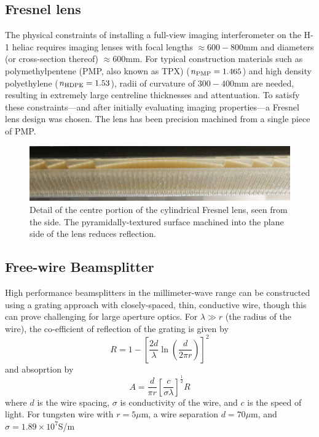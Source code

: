 \thispagestyle{empty}
\subsection{Fresnel lens}
The physical constraints of installing a full-view imaging interferometer on
the H-1 heliac requires imaging lenses with focal lengths $\approx 600
- 800$mm and diameters (or cross-section thereof) $\approx
600$mm.
For typical construction materials such as polymethylpentene
(PMP, also known as TPX) ($n_{\rm PMP} = 1.465$) and high density
polyethylene ($n_{\rm HDPE} = 1.53$), radii of curvature of $300 -
400$mm are needed, resulting in extremely large centreline thicknesses and
attentuation.
To satisfy these constraints---and after initially evaluating imaging properties\cite{MAHON2011}---a Fresnel lens design was chosen.
The lens has been precision machined from a single piece of PMP.
\begin{figure}[htbp]
\includegraphics[width=\columnwidth]{figures/fresnel_lens_detail}
\caption{Detail of the centre portion of the cylindrical Fresnel lens,
  seen from the side. The pyramidally-textured surface machined into
  the plane side of the lens reduces reflection.}%
\label{fig:antiref_photo}
\end{figure}

\subsection{Free-wire Beamsplitter}
High performance beamsplitters in the millimeter-wave range can be
constructed using a grating approach with closely-spaced, thin,
conductive wire, though this can prove challenging for large aperture optics.
For $\lambda \gg r$ (the radius of the wire), the co-efficient of reflection of the grating is given by
\cite{CASEY1952, RENK1962}
\begin{equation}
R = 1 - \left[ \frac{2d}{\lambda} \ln (\frac{d}{2 \pi r}) \right] ^2
\label{eq:beamsplitter_trans}
\end{equation}
and absoprtion by
\begin{equation}
A = \frac{d}{\pi r} \left[ {\frac{c}{\sigma \lambda}} \right]
^{\frac{1}{2}} R
\label{eq:beamsplitter_abs}
\end{equation}
where $d$ is the wire spacing, $\sigma$ is conductivity of the wire,
and $c$ is the speed of light.
For tungsten wire with $r = 5$\ts{}$\mu$m, a wire separation $d =
70$\ts{}$\mu$m, and $\sigma = 1.89 \times 10^7$\ts{}S/m

